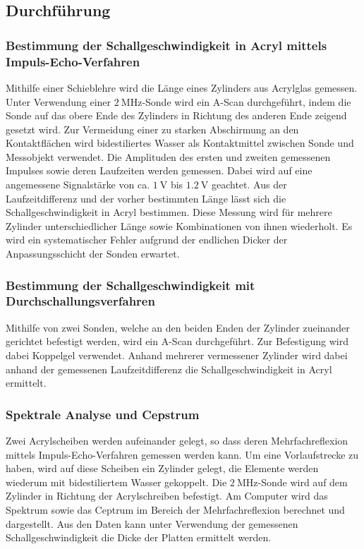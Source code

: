 \subsection{Durchführung}
\label{sec:durchführung}
\subsubsection{Bestimmung der Schallgeschwindigkeit in Acryl mittels Impuls-Echo-Verfahren}
Mithilfe einer Schieblehre wird die Länge eines Zylinders aus Acrylglas gemessen.
Unter Verwendung einer $\SI{2}{\mega\hertz}$-Sonde wird ein A-Scan durchgeführt, indem die Sonde auf das obere Ende des Zylinders in Richtung des anderen Ende zeigend gesetzt wird.
Zur Vermeidung einer zu starken Abschirmung an den Kontaktflächen wird bidestiliertes Wasser als Kontaktmittel zwischen Sonde und Messobjekt verwendet.
Die Amplituden des ersten und zweiten gemessenen Impulses sowie deren Laufzeiten werden gemessen.
Dabei wird auf eine angemessene Signalstärke von ca. $\SI{1}{\volt}$ bis $\SI{1.2}{\volt}$ geachtet.
Aus der Laufzeitdifferenz und der vorher bestimmten Länge lässt sich die Schallgeschwindigkeit in Acryl bestimmen.
Diese Messung wird für mehrere Zylinder unterschiedlicher Länge sowie Kombinationen von ihnen wiederholt.
Es wird ein systematischer Fehler aufgrund der endlichen Dicker der Anpassungsschicht der Sonden erwartet.

\subsubsection{Bestimmung der Schallgeschwindigkeit mit Durchschallungsverfahren}
Mithilfe von zwei Sonden, welche an den beiden Enden der Zylinder zueinander gerichtet befestigt werden, wird ein A-Scan durchgeführt.
Zur Befestigung wird dabei Koppelgel verwendet.
Anhand mehrerer vermessener Zylinder wird dabei anhand der gemessenen Laufzeitdifferenz die Schallgeschwindigkeit in Acryl ermittelt.

\subsubsection{Spektrale Analyse und Cepstrum}
Zwei Acrylscheiben werden aufeinander gelegt, so dass deren Mehrfachreflexion mittels Impuls-Echo-Verfahren gemessen werden kann.
Um eine Vorlaufstrecke zu haben, wird auf diese Scheiben ein Zylinder gelegt, die Elemente werden wiederum mit bidestiliertem Wasser gekoppelt.
Die $\SI{2}{\mega\hertz}$-Sonde wird auf dem Zylinder in Richtung der Acrylschreiben befestigt.
Am Computer wird das Spektrum sowie das Ceptrum im Bereich der Mehrfachreflexion berechnet und dargestellt.
Aus den Daten kann unter Verwendung der gemessenen Schallgeschwindigkeit die Dicke der Platten ermittelt werden.


